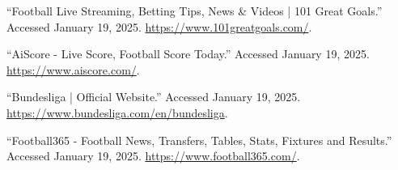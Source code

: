 \documentclass{report}
\begin{document}

\begin{thebibliography}{24}
``Football Live Streaming, Betting Tips, News \& Videos | 101 Great Goals.'' Accessed January 19, 2025. \url{https://www.101greatgoals.com/}.

``AiScore - Live Score, Football Score Today.'' Accessed January 19, 2025. \url{https://www.aiscore.com/}.

``Bundesliga | Official Website.'' Accessed January 19, 2025. \url{https://www.bundesliga.com/en/bundesliga}.


``Football365 - Football News, Transfers, Tables, Stats, Fixtures and Results.'' Accessed January 19, 2025. \url{https://www.football365.com/}.
\end{thebibliography}
\end{document}
